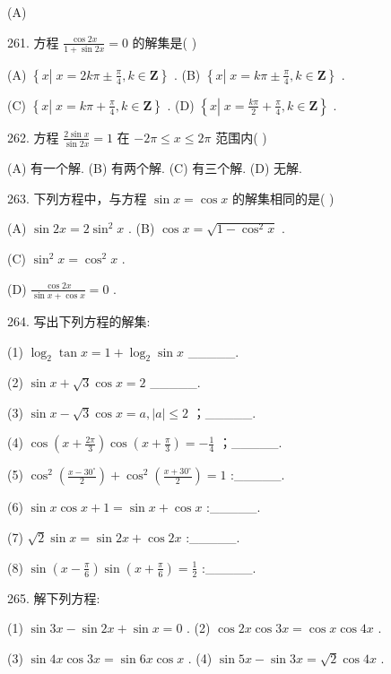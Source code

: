 \documentclass[10pt]{article}
\begin{document}
(A)

261. 方程 \(\frac{\cos {2x}}{1 + \sin {2x}} = 0\) 的解集是( )

(A) \(\left\{  {x\left| {\;x = {2k\pi } \pm  \frac{\pi }{4}}\right. ,k \in  \mathbf{Z}}\right\}\) . (B) \(\left\{  {x\left| {\;x = {k\pi } \pm  \frac{\pi }{4}}\right. ,k \in  \mathbf{Z}}\right\}\) .

(C) \(\left\{  {x\left| {\;x = {k\pi } + \frac{\pi }{4}}\right. ,k \in  \mathbf{Z}}\right\}\) . (D) \(\left\{  {x\left| {\;x = \frac{k\pi }{2} + \frac{\pi }{4}}\right. ,k \in  \mathbf{Z}}\right\}\) .

262. 方程 \(\frac{2\sin x}{\sin {2x}} = 1\) 在 \(- {2\pi } \leq  x \leq  {2\pi }\) 范围内( )

(A) 有一个解. (B) 有两个解. (C) 有三个解. (D) 无解.

263. 下列方程中，与方程 \(\sin x = \cos x\) 的解集相同的是( )

(A) \(\sin {2x} = 2{\sin }^{2}x\) . (B) \(\cos x = \sqrt{1 - {\cos }^{2}x}\) .

(C) \({\sin }^{2}x = {\cos }^{2}x\) .

(D) \(\frac{\cos {2x}}{\sin x + \cos x} = 0\) .

264. 写出下列方程的解集:

(1) \({\log }_{2}\tan x = 1 + {\log }_{2}\sin x\) \_\_\_\_\_.

(2) \(\sin x + \sqrt{3}\cos x = 2\) \_\_\_\_\_.

(3) \(\sin x - \sqrt{3}\cos x = a,\left| a\right|  \leq  2\) ；\_\_\_\_\_.

(4) \(\cos \left( {x + \frac{2\pi }{3}}\right) \cos \left( {x + \frac{\pi }{3}}\right)  =  - \frac{1}{4}\) ；\_\_\_\_\_.

(5) \({\cos }^{2}\left( \frac{x - {30}^{ \circ  }}{2}\right)  + {\cos }^{2}\left( \frac{x + {30}^{ \circ  }}{2}\right)  = 1\) :\_\_\_\_\_.

(6) \(\sin x\cos x + 1 = \sin x + \cos x\) :\_\_\_\_\_.

(7) \(\sqrt{2}\sin x = \sin {2x} + \cos {2x}\) :\_\_\_\_\_.

(8) \(\sin \left( {x - \frac{\pi }{6}}\right) \sin \left( {x + \frac{\pi }{6}}\right)  = \frac{1}{2}\) :\_\_\_\_\_.

265. 解下列方程:

(1) \(\sin {3x} - \sin {2x} + \sin x = 0\) . (2) \(\cos {2x}\cos {3x} = \cos x\cos {4x}\) .

(3) \(\sin {4x}\cos {3x} = \sin {6x}\cos x\) . (4) \(\sin {5x} - \sin {3x} = \sqrt{2}\cos {4x}\) .
\end{document}
